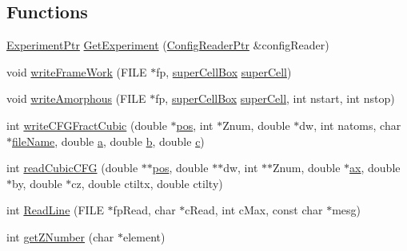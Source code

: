 \subsection*{Functions}
\begin{DoxyCompactItemize}
\item 
\hyperlink{namespace_q_s_t_e_m_a726e6914597164e389850f3db0512e7b}{Experiment\-Ptr} \hyperlink{namespace_q_s_t_e_m_a7bddd87825c86fdbd52398187cdc932d}{Get\-Experiment} (\hyperlink{namespace_q_s_t_e_m_af9424707fe9f6503298f49b41304bd35}{Config\-Reader\-Ptr} \&config\-Reader)
\item 
void \hyperlink{namespace_q_s_t_e_m_a91f650de6c17fd6a4ce5674204047bee}{write\-Frame\-Work} (F\-I\-L\-E $\ast$fp, \hyperlink{namespace_q_s_t_e_m_a95dba085aec372efb54903125453c0c1}{super\-Cell\-Box} \hyperlink{gbmaker_8cpp_ad0c1687ea19d548901a58ba8f0818b1f}{super\-Cell})
\item 
void \hyperlink{namespace_q_s_t_e_m_a7749ff6124f5ab0a9c20933545a14179}{write\-Amorphous} (F\-I\-L\-E $\ast$fp, \hyperlink{namespace_q_s_t_e_m_a95dba085aec372efb54903125453c0c1}{super\-Cell\-Box} \hyperlink{gbmaker_8cpp_ad0c1687ea19d548901a58ba8f0818b1f}{super\-Cell}, int nstart, int nstop)
\item 
int \hyperlink{namespace_q_s_t_e_m_a90f4692ae2fc27595ac4e44b182c1bf9}{write\-C\-F\-G\-Fract\-Cubic} (double $\ast$\hyperlink{_display_model_properties_8m_adf54215d760dbf0f9fe5627a39015333}{pos}, int $\ast$Znum, double $\ast$dw, int natoms, char $\ast$\hyperlink{qmb_8m_a7a230f02bdffebd1357e3c0b49e01271}{file\-Name}, double \hyperlink{image_sim_8m_aa9c57d86c53f86ed6afc6339a0476363}{a}, double \hyperlink{xyz2cfg_8m_a21ad0bd836b90d08f4cf640b4c298e7c}{b}, double \hyperlink{image_sim_8m_a463b16ca2bfa2f0cbab0e62fcb263d8e}{c})
\item 
int \hyperlink{namespace_q_s_t_e_m_adde764026530aeeee9e7914ad97a048c}{read\-Cubic\-C\-F\-G} (double $\ast$$\ast$\hyperlink{_display_model_properties_8m_adf54215d760dbf0f9fe5627a39015333}{pos}, double $\ast$$\ast$dw, int $\ast$$\ast$Znum, double $\ast$\hyperlink{image_sim_8m_a8fa675eb2fcec5b95d9d21c670da7f30}{ax}, double $\ast$by, double $\ast$cz, double ctiltx, double ctilty)
\item 
int \hyperlink{namespace_q_s_t_e_m_a1d7a548937e7c9f3611840c0076a807c}{Read\-Line} (F\-I\-L\-E $\ast$fp\-Read, char $\ast$c\-Read, int c\-Max, const char $\ast$mesg)
\item 
int \hyperlink{namespace_q_s_t_e_m_a3558bc3153acae75fb497d58b3081c55}{get\-Z\-Number} (char $\ast$element)
\item 
$$
\end{DoxyCompactItemize}
